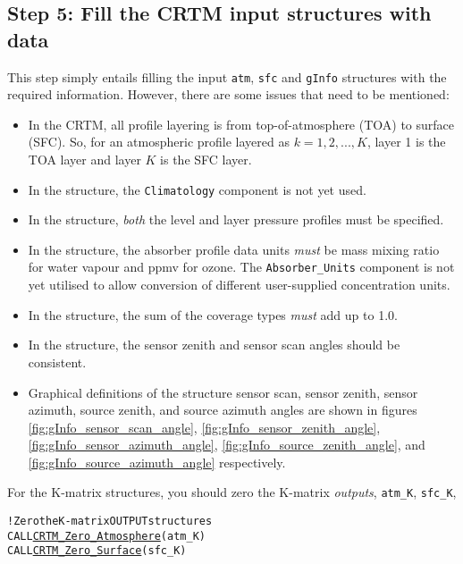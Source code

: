 \subsection{Step 5: Fill the CRTM input structures with data}
This step simply entails filling the input \texttt{atm}, \texttt{sfc} and \texttt{gInfo} structures with the required information. However, there are some issues that need to be mentioned:
\begin{itemize}
  \item In the CRTM, all profile layering is from top-of-atmosphere (TOA) to surface (SFC). So, for an atmospheric profile layered as $k = 1,2,...,K$, layer 1 is the TOA layer and layer $K$ is the SFC layer.
  \item In the \hyperref[sec:atmosphere_structure]{\Atmosphere} structure, the \texttt{Climatology} component is not yet used.
  \item In the \hyperref[sec:atmosphere_structure]{\Atmosphere} structure, \emph{both} the level and layer pressure profiles must be specified.
  \item In the \hyperref[sec:atmosphere_structure]{\Atmosphere} structure, the absorber profile data units \emph{must} be mass mixing ratio for water vapour and ppmv for ozone. The \texttt{Absorber\_Units} component is not yet utilised to allow conversion of different user-supplied concentration units.
  \item In the \hyperref[sec:surface_structure]{\Surface} structure, the sum of the coverage types \emph{must} add up to 1.0.
  \item In the \hyperref[sec:geometryinfo_structure]{\GeometryInfo} structure, the sensor zenith and sensor scan angles should be consistent.
  \item Graphical definitions of the \hyperref[sec:geometryinfo_structure]{\GeometryInfo} structure sensor scan, sensor zenith, sensor azimuth, source zenith, and source azimuth angles are shown in figures \ref{fig:gInfo_sensor_scan_angle}, \ref{fig:gInfo_sensor_zenith_angle}, \ref{fig:gInfo_sensor_azimuth_angle}, \ref{fig:gInfo_source_zenith_angle}, and  \ref{fig:gInfo_source_azimuth_angle} respectively.
\end{itemize}
For the K-matrix structures, you should zero the K-matrix \emph{outputs}, \texttt{atm\_K}, \texttt{sfc\_K},
\begin{alltt}
  ! Zero the K-matrix OUTPUT structures
  CALL \hyperref[sec:CRTM_Zero_Atmosphere_interface]{CRTM_Zero_Atmosphere}( atm_K )
  CALL \hyperref[sec:CRTM_Zero_Surface_interface]{CRTM_Zero_Surface}( sfc_K )\end{alltt}
